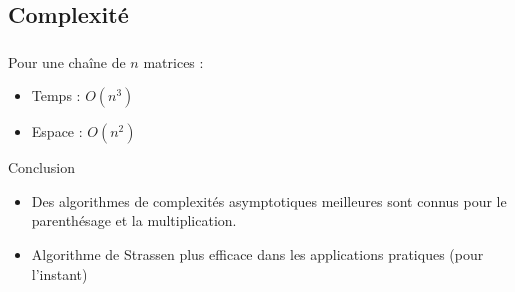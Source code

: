 \documentclass{beamer}
\begin{document}
\subsection{Complexité}
\begin{frame}
  \frametitle{\insertsubsection}
  Pour une chaîne de $n$ matrices :
  \begin{itemize}
    \item Temps : $O(n^3)$
    \item Espace : $O(n^2)$
  \end{itemize}
\end{frame}


\begin{frame}{Conclusion}
  \begin{itemize}
    \item Des algorithmes de complexités asymptotiques meilleures
    sont connus pour le parenthésage et la multiplication.
    \item Algorithme de Strassen plus efficace dans les
    applications pratiques (pour l'instant)
  \end{itemize}
\end{frame}
\end{document}
